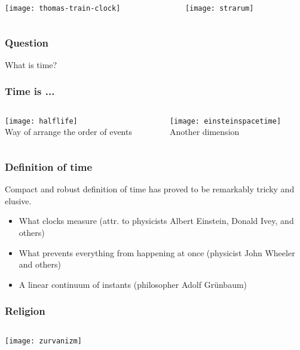 \documentclass[aspectratio=169]{beamer}
\begin{document}
{\begin{gdblank}
\begin{columns}
			\begin{column}{0.5\textwidth}
				\centering\texttt{[image: thomas-train-clock]} 
			\end{column}
			\pause 
			\begin{column}{0.5\textwidth}
				\centering\texttt{[image: strarum]} 
			\end{column}
		\end{columns}            
	\end{gdblank}
	\begin{gdblankclock}
		\frametitle{Question}
		\centering\Huge What is time?           
	\end{gdblankclock} 
	\begin{gdblank}
		\frametitle{Time is ...}
		\begin{columns}
			\begin{column}{0.5\textwidth}
				\centering\texttt{[image: halflife]} 
				\\Way of arrange the order of events 
			\end{column}
			\pause 
			\begin{column}{0.5\textwidth}
				\centering\texttt{[image: einsteinspacetime]} 
				\\Another dimension
			\end{column}
		\end{columns} 
	\end{gdblank} 
	\begin{gdblank}
		\frametitle{Definition of time}
		\LARGE Compact and robust definition of time has proved to be remarkably tricky and elusive.
		\large
		\vskip1cm
		\begin{itemize}
			\item What clocks measure (attr. to physicists Albert Einstein, Donald Ivey, and others)
			      \pause
			\item What prevents everything from happening at once (physicist John Wheeler and others)
			\item A linear continuum of instants (philosopher Adolf Grünbaum)
		\end{itemize}
	\end{gdblank}
	\begin{gdblank}
		\frametitle{Religion}
		\begin{columns}
			\begin{column}{0.5\textwidth}
				\centering\texttt{[image: zurvanizm]} 
			\end{column}
			\begin{column}{0.5\textwidth}

\end{column}
\end{columns}
\end{gdblank}}
\end{document}
